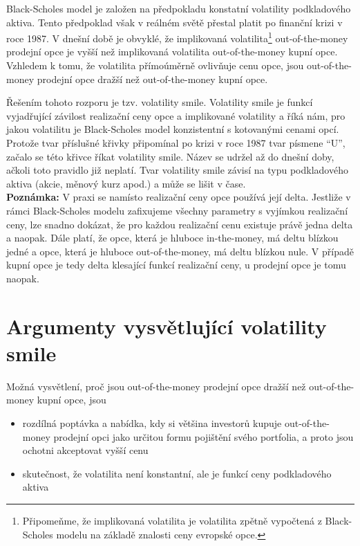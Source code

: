 \documentclass[a4paper]{book}
\begin{document}
Black-Scholes model je založen na předpokladu konstatní volatility podkladového aktiva. Tento předpoklad však v reálném světě přestal platit po finanční krizi v roce 1987. V dnešní době je obvyklé, že implikovaná volatilita\footnote{Připomeňme, že implikovaná volatilita je volatilita zpětně vypočtená z Black-Scholes modelu na základě znalosti ceny evropské opce.} out-of-the-money prodejní opce je vyšší než implikovaná volatilita out-of-the-money kupní opce. Vzhledem k tomu, že volatilita přímoúměrně ovlivňuje cenu opce, jsou out-of-the-money prodejní opce dražší než out-of-the-money kupní opce.

Řešením tohoto rozporu je tzv. volatility smile. Volatility smile je funkcí vyjadřující závilost realizační ceny opce a implikované volatility a říká nám, pro jakou volatilitu je Black-Scholes model konzistentní s kotovanými cenami opcí. Protože tvar příslušné křivky připomínal po krizi v roce 1987 tvar písmene ``U'', začalo se této křivce říkat volatility smile. Název se udržel až do dnešní doby, ačkoli toto pravidlo již neplatí. Tvar volatility smile závisí na typu podkladového aktiva (akcie, měnový kurz apod.) a může se lišit v čase.\\

\noindent \textbf{Poznámka:} V praxi se namísto realizační ceny opce používá její delta. Jestliže v rámci Black-Scholes modelu zafixujeme všechny parametry s vyjímkou realizační ceny, lze snadno dokázat, že pro každou realizační cenu existuje právě jedna delta a naopak. Dále platí, že opce, která je hluboce in-the-money, má deltu blízkou jedné a opce, která je hluboce out-of-the-money, má deltu blízkou nule. V případě kupní opce je tedy delta klesající funkcí realizační ceny, u prodejní opce je tomu naopak.

\section{Argumenty vysvětlující volatility smile}

Možná vysvětlení, proč jsou out-of-the-money prodejní opce dražší než out-of-the-money kupní opce, jsou
\begin{itemize}
\item rozdílná poptávka a nabídka, kdy si většina investorů kupuje out-of-the-money prodejní opci jako určitou formu pojištění svého portfolia, a proto jsou ochotni akceptovat vyšší cenu
\item skutečnost, že volatilita není konstantní, ale je funkcí ceny podkladového aktiva
\end{itemize}
\end{document}
